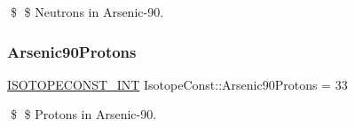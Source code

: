 \$ \$ Neutrons in Arsenic-\/90. \mbox{\label{group___isotope_const-_arsenic-_as90_ga19b7e2f8f799ca9e25feafbed69f2160}} 
\subsubsection{\texorpdfstring{Arsenic90\+Protons}{Arsenic90Protons}}
{\footnotesize\ttfamily \mbox{\hyperlink{group___isotope_const-_macros_ga5f18360b3e99483a35c32d789e62621c}{I\+S\+O\+T\+O\+P\+E\+C\+O\+N\+S\+T\+\_\+\+I\+NT}} Isotope\+Const\+::\+Arsenic90\+Protons = 33}

\$ \$ Protons in Arsenic-\/90. 